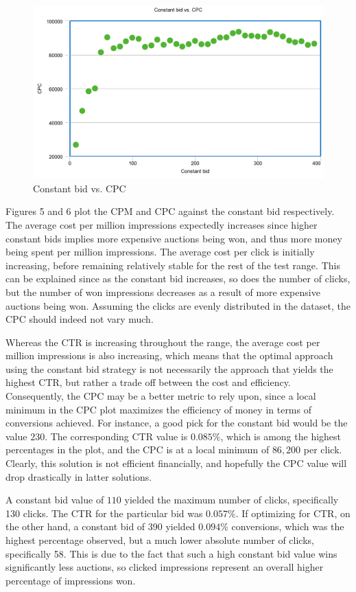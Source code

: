 \documentclass{sig-alternate-05-2015}
\begin{document}
\begin{figure}
  \includegraphics[width=\linewidth]{constant_cpc.png}
  \caption{Constant bid vs. CPC}
  \label{fig:CPM}
\end{figure}

Figures 5 and 6 plot the CPM and CPC against the constant bid respectively. The average cost per million impressions expectedly increases since higher constant bids implies more expensive auctions being won, and thus more money being spent per million impressions. The average cost per click is initially increasing, before remaining relatively stable for the rest of the test range. This can be explained since as the constant bid increases, so does the number of clicks, but the number of won impressions decreases as a result of more expensive auctions being won. Assuming the clicks are evenly distributed in the dataset, the CPC should indeed not vary  much.

Whereas the CTR is increasing throughout the range, the average cost per million impressions is also increasing, which means that the optimal approach using the constant bid strategy is not necessarily the approach that yields the highest CTR, but rather a trade off between the cost and efficiency. Consequently, the CPC may be a better metric to rely upon, since a local minimum in the CPC plot maximizes the efficiency of money in terms of conversions achieved. For instance, a good pick for the constant bid would be the value $230$. The corresponding CTR value is $0.085\%$, which is among the highest percentages in the plot, and the CPC is at a local minimum of $86,200$ per click. Clearly, this solution is not efficient financially, and hopefully the CPC value will drop drastically in latter solutions.

A constant bid value of $110$ yielded the maximum number of clicks, specifically 130 clicks. The CTR for the particular bid was $0.057\%$. If optimizing for CTR, on the other hand, a constant bid of 390 yielded $0.094\%$ conversions, which was the highest percentage observed, but a much lower absolute number of clicks, specifically 58. This is due to the fact that such a high constant bid value wins significantly less auctions, so clicked impressions represent an overall higher percentage of impressions won.
\end{document}

